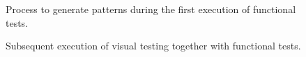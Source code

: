 \documentclass[11pt,oneside,final]{fithesis2}
\begin{document}
   \begin{figure}[!htb]
    \begin{center}
    \leavevmode
    \centerline{}
    \end{center}
    \caption{Process to generate patterns during the first execution of functional tests.}
    \label{fig:FirstTestsRunBMPN}
  \end{figure}
  
  \begin{figure}[!htb]
    \begin{center}
    \leavevmode
    \centerline{}
    \end{center}
    \caption{Subsequent execution of visual testing together with functional tests.}
    \label{fig:NextTestsRunsBMPN}
  \end{figure}
  
\end{document}
